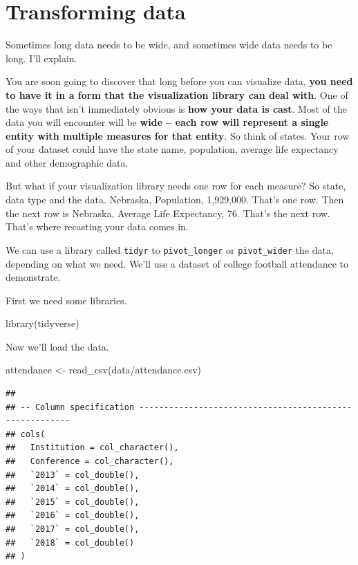 \documentclass[
]{book}
\newenvironment{Shaded}{\begin{snugshade}}{\end{snugshade}}
\newcommand{\FunctionTok}[1]{\textcolor[rgb]{0.00,0.00,0.00}{#1}}
\newcommand{\NormalTok}[1]{#1}
\newcommand{\OtherTok}[1]{\textcolor[rgb]{0.56,0.35,0.01}{#1}}
\newcommand{\StringTok}[1]{\textcolor[rgb]{0.31,0.60,0.02}{#1}}
\begin{document}
\hypertarget{transforming-data}{%
\chapter{Transforming data}\label{transforming-data}}

Sometimes long data needs to be wide, and sometimes wide data needs to be long. I'll explain.

You are soon going to discover that long before you can visualize data, \textbf{you need to have it in a form that the visualization library can deal with}. One of the ways that isn't immediately obvious is \textbf{how your data is cast}. Most of the data you will encounter will be \textbf{wide -- each row will represent a single entity with multiple measures for that entity}. So think of states. Your row of your dataset could have the state name, population, average life expectancy and other demographic data.

But what if your visualization library needs one row for each measure? So state, data type and the data. Nebraska, Population, 1,929,000. That's one row. Then the next row is Nebraska, Average Life Expectancy, 76. That's the next row. That's where recasting your data comes in.

We can use a library called \texttt{tidyr} to \texttt{pivot\_longer} or \texttt{pivot\_wider} the data, depending on what we need. We'll use a dataset of college football attendance to demonstrate.

First we need some libraries.

\begin{Shaded}
\begin{Highlighting}[]
\FunctionTok{library}\NormalTok{(tidyverse)}
\end{Highlighting}
\end{Shaded}

Now we'll load the data.

\begin{Shaded}
\begin{Highlighting}[]
\NormalTok{attendance }\OtherTok{\textless{}{-}} \FunctionTok{read\_csv}\NormalTok{(}\StringTok{\textquotesingle{}data/attendance.csv\textquotesingle{}}\NormalTok{)}
\end{Highlighting}
\end{Shaded}

\begin{verbatim}
## 
## -- Column specification --------------------------------------------------------
## cols(
##   Institution = col_character(),
##   Conference = col_character(),
##   `2013` = col_double(),
##   `2014` = col_double(),
##   `2015` = col_double(),
##   `2016` = col_double(),
##   `2017` = col_double(),
##   `2018` = col_double()
## )
\end{verbatim}
\end{document}
